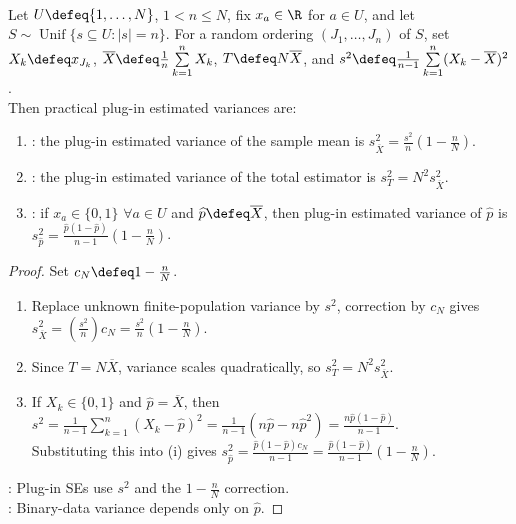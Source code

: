 \begin{corollary} \label{cor:srs-estimated-standard-errors} \\
Let $U\defeq\{1,\ldots,N\}$, $1<n\leq N$, fix $x_a\in\R$ for $a\in U$, and let $S\sim\operatorname{Unif}\{s\subseteq U:|s|=n\}$. For a random ordering $(J_1,\ldots,J_n)$ of $S$, set $X_k\defeq x_{J_k}$, $\overline{X}\defeq \frac{1}{n}\sum\limits_{k=1}^{n}X_k$, $T\defeq N\overline{X}$, and $s^2\defeq \frac{1}{n-1}\sum\limits_{k=1}^{n}(X_k-\overline{X})^2$.\\
Then practical plug-in estimated variances are:
\begin{enumerate}[label=(\roman*)]
\setlength{\itemsep}{0pt}
\item {}: the plug-in estimated variance of the sample mean is $s_{\overline{X}}^2=\frac{s^2}{n}\left(1-\frac{n}{N}\right)$.
\item {}: the plug-in estimated variance of the total estimator is $s_T^2=N^2s_{\overline{X}}^2$.
\item {}: if $x_a\in\{0,1\}$ $\forall a\in U$ and $\widehat p\defeq\overline{X}$, then plug-in estimated variance of $\widehat p$ is $s_{\widehat p}^2=\frac{\widehat p(1-\widehat p)}{n-1}\left(1-\frac{n}{N}\right)$.
\end{enumerate}
\begin{proof}
Set $c_N\defeq1-\frac{n}{N}$.
\begin{enumerate}[label=(\roman*)]
\setlength{\itemsep}{0pt}
\item Replace unknown finite-population variance by $s^2$, correction by $c_N$ gives $s_{\overline{X}}^2=(\frac{s^2}{n})c_N=\frac{s^2}{n}(1-\frac{n}{N})$.
\item Since $T=N\overline{X}$, variance scales quadratically, so $s_T^2=N^2s_{\overline{X}}^2$.
\item If $X_k\in\{0,1\}$ and $\widehat p=\overline{X}$, then $s^2=\frac{1}{n-1}\sum\limits_{k=1}^{n}(X_k-\widehat p)^2=\frac{1}{n-1}(n\widehat p-n\widehat p^2)=\frac{n\widehat p(1-\widehat p)}{n-1}$.\\
Substituting this into (i) gives $s_{\widehat p}^2=\frac{\widehat p(1-\widehat p)c_N}{n-1}=\frac{\widehat p(1-\widehat p)}{n-1}(1-\frac{n}{N})$.
\end{enumerate}
: Plug-in SEs use $s^2$ and the $1-\frac{n}{N}$ correction.\\
: Binary-data variance depends only on $\widehat p$.
\end{proof}
\end{corollary}

